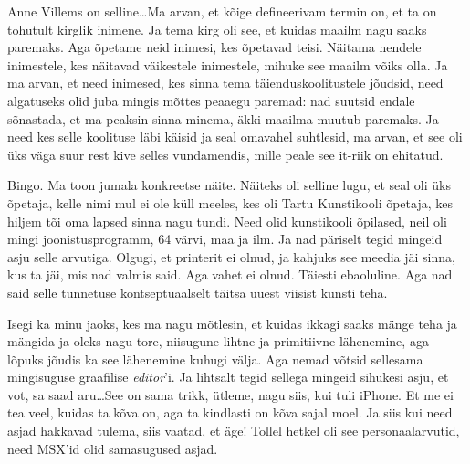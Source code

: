 Anne Villems on selline\ldots  Ma arvan, et kõige defineerivam termin on, et ta 
on tohutult kirglik inimene. Ja tema kirg oli see, et kuidas maailm nagu saaks 
paremaks. Aga  õpetame neid inimesi, kes õpetavad teisi. Näitama nendele 
inimestele, kes näitavad väikestele inimestele, mihuke see maailm võiks olla. 
Ja ma arvan, et need inimesed, kes sinna tema täienduskoolitustele jõudsid, 
need algatuseks olid juba mingis mõttes peaaegu paremad: nad suutsid endale  
sõnastada, et ma peaksin sinna minema, äkki maailma muutub paremaks. Ja need 
kes selle koolituse läbi käisid ja seal  omavahel suhtlesid, ma arvan, et see 
oli  üks väga suur rest kive selles vundamendis, mille peale see it-riik on 
ehitatud.


Bingo. Ma toon jumala konkreetse näite. Näiteks oli selline lugu, et seal oli 
üks õpetaja, kelle nimi mul ei ole küll meeles, kes oli Tartu 
Kunstikooli õpetaja, kes hiljem tõi oma lapsed 
sinna nagu tundi. Need olid kunstikooli õpilased, neil oli mingi 
joonistusprogramm, 64 värvi, maa ja ilm. Ja nad päriselt tegid mingeid asju 
selle arvutiga. Olgugi, et printerit ei olnud, ja kahjuks see meedia jäi sinna, 
kus ta jäi,  mis nad valmis said. Aga vahet ei olnud. Täiesti ebaoluline. Aga 
nad said selle tunnetuse kontseptuaalselt täitsa uuest viisist kunsti teha. 

Isegi ka minu jaoks, kes ma nagu mõtlesin, et kuidas ikkagi saaks mänge teha ja 
mängida ja  oleks nagu tore, niisugune lihtne ja primitiivne lähenemine, aga 
lõpuks jõudis ka see lähenemine kuhugi välja. Aga nemad võtsid sellesama 
mingisuguse graafilise \emph{editor}'i. Ja lihtsalt tegid sellega mingeid 
sihukesi asju, et vot, sa saad aru\ldots See on sama trikk, ütleme, nagu siis, 
kui tuli iPhone. Et me ei tea veel, kuidas ta kõva on, aga ta kindlasti on kõva 
sajal moel. Ja siis kui need asjad hakkavad tulema, siis vaatad, et äge! Tollel 
hetkel oli see personaalarvutid, need MSX'id olid samasugused asjad.


